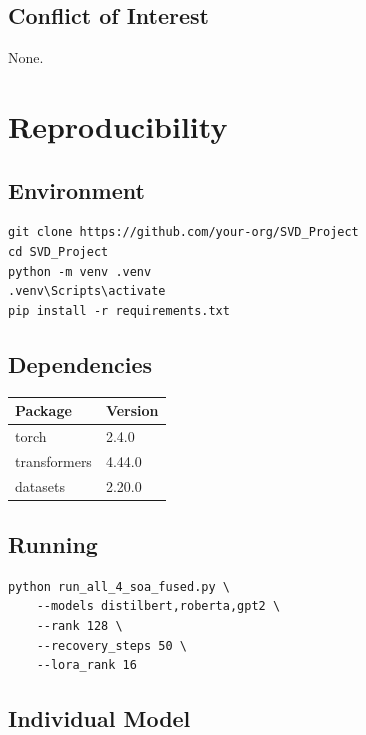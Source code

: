 \subsection{Conflict of Interest}

None.



\section{Reproducibility}

\subsection{Environment}

\begin{lstlisting}
git clone https://github.com/your-org/SVD_Project
cd SVD_Project
python -m venv .venv
.venv\Scripts\activate
pip install -r requirements.txt
\end{lstlisting}

\subsection{Dependencies}

\begin{table}[H]
\centering
\small
\begin{tabular}{ll}
\toprule
\textbf{Package} & \textbf{Version} \\
\midrule
torch & 2.4.0 \\
transformers & 4.44.0 \\
datasets & 2.20.0 \\
\bottomrule
\end{tabular}
\end{table}

\subsection{Running}

\begin{lstlisting}
python run_all_4_soa_fused.py \
    --models distilbert,roberta,gpt2 \
    --rank 128 \
    --recovery_steps 50 \
    --lora_rank 16
\end{lstlisting}

\subsection{Individual Model}

